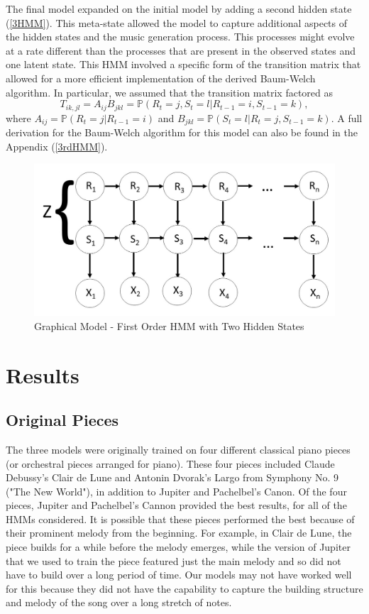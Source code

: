 \documentclass{article} %
\begin{document}
The final model expanded on the initial model by adding a second hidden state (\autoref{3HMM}). This meta-state allowed the model to capture additional aspects of the hidden states and the music generation process.  This processes might evolve at a rate different than the processes that are present in the observed states and one latent state.  This HMM involved a specific form of the transition matrix that allowed for a more efficient  implementation of the derived Baum-Welch algorithm.  In particular, we assumed that the transition matrix factored as
$$T_{ik, jl} = A_{ij}B_{jkl} = \mathbb{P}(R_t = j, S_t = l | R_{t-1} = i, S_{t-1} = k),$$
where $A_{ij} = \mathbb{P}(R_t = j | R_{t-1} = i)$ and $B_{jkl} = \mathbb{P}(S_t = l | R_t = j, S_{t-1} = k)$.  A full derivation for the Baum-Welch algorithm for this model can also be found in the Appendix (\autoref{3rdHMM}).

\begin{figure}[H]
\centering

\includegraphics [scale = 0.35] {Model3.jpg}
\caption{Graphical Model - First Order HMM with Two Hidden States\label{3HMM}}
\end{figure}


\section{Results}

\subsection{Original Pieces}

The three models were originally trained on four different classical piano pieces (or orchestral pieces arranged for piano).  These four pieces included Claude Debussy's Clair de Lune and Antonin Dvorak's Largo from Symphony No. 9 ("The New World"), in addition to Jupiter and Pachelbel's Canon.  Of the four pieces, Jupiter and Pachelbel's Cannon provided the best results, for all of the HMMs considered. It is possible that these pieces performed the best because of their prominent melody from the beginning. For example, in  Clair de Lune, the piece builds for a while before the melody emerges, while the version of Jupiter that we used to train the piece featured just the main melody and so did not have to build over a long period of time. Our models may not have worked well for this because they did not have the capability to capture the building structure and melody of the song over a long stretch of notes.  
\end{document}
